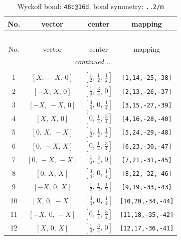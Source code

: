 \documentclass[fleqn,8pt]{jsarticle}
\begin{document}
\renewcommand{\arraystretch}{1.2}
\begin{longtable}{cccc}
\caption{Wyckoff bond: {\tt 48c@16d}, bond symmetry: {\tt ..2/m}}
 \\
 \hline \hline
No. & vector & center & mapping \\ \hline \endfirsthead

\multicolumn{3}{l}{\tablename\ \thetable{}} \\
 \hline \hline
No. & vector & center & mapping \\ \hline \endhead

 \hline \hline
\multicolumn{3}{r}{\footnotesize\it continued ...} \\ \endfoot

 \hline \hline
\multicolumn{3}{r}{} \\ \endlastfoot

1 & $\left[ X,\, - X,\, 0 \right]$ & $\left[ \frac{1}{2},\, \frac{1}{2},\, \frac{1}{2} \right]$ & {\tt [1,14,-25,-38]} \\ \hline
2 & $\left[ - X,\, X,\, 0 \right]$ & $\left[ \frac{1}{4},\, \frac{3}{4},\, 0 \right]$ & {\tt [2,13,-26,-37]} \\ \hline
3 & $\left[ - X,\, - X,\, 0 \right]$ & $\left[ \frac{3}{4},\, 0,\, \frac{1}{4} \right]$ & {\tt [3,15,-27,-39]} \\ \hline
4 & $\left[ X,\, X,\, 0 \right]$ & $\left[ 0,\, \frac{1}{4},\, \frac{3}{4} \right]$ & {\tt [4,16,-28,-40]} \\ \hline
5 & $\left[ 0,\, X,\, - X \right]$ & $\left[ \frac{1}{2},\, \frac{1}{2},\, \frac{1}{2} \right]$ & {\tt [5,24,-29,-48]} \\ \hline
6 & $\left[ 0,\, - X,\, X \right]$ & $\left[ 0,\, \frac{1}{4},\, \frac{3}{4} \right]$ & {\tt [6,23,-30,-47]} \\ \hline
7 & $\left[ 0,\, - X,\, - X \right]$ & $\left[ \frac{1}{4},\, \frac{3}{4},\, 0 \right]$ & {\tt [7,21,-31,-45]} \\ \hline
8 & $\left[ 0,\, X,\, X \right]$ & $\left[ \frac{3}{4},\, 0,\, \frac{1}{4} \right]$ & {\tt [8,22,-32,-46]} \\ \hline
9 & $\left[ - X,\, 0,\, X \right]$ & $\left[ \frac{1}{2},\, \frac{1}{2},\, \frac{1}{2} \right]$ & {\tt [9,19,-33,-43]} \\ \hline
10 & $\left[ X,\, 0,\, - X \right]$ & $\left[ \frac{3}{4},\, 0,\, \frac{1}{4} \right]$ & {\tt [10,20,-34,-44]} \\ \hline
11 & $\left[ - X,\, 0,\, - X \right]$ & $\left[ 0,\, \frac{1}{4},\, \frac{3}{4} \right]$ & {\tt [11,18,-35,-42]} \\ \hline
12 & $\left[ X,\, 0,\, X \right]$ & $\left[ \frac{1}{4},\, \frac{3}{4},\, 0 \right]$ & {\tt [12,17,-36,-41]} \\
\end{longtable}
\end{document}

